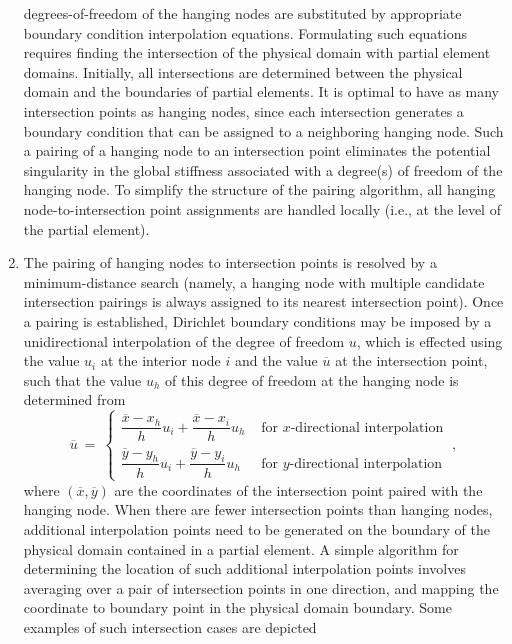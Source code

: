 \documentclass[12pt,twoside]{article}
\begin{document}
\begin{enumerate}
degrees-of-freedom of the hanging nodes are substituted by
appropriate boundary condition interpolation equations.
Formulating such equations requires finding the intersection of the physical 
domain with partial element domains. Initially, all intersections are
determined between the physical domain and the boundaries of partial
elements. It is optimal to have as many intersection points as 
hanging nodes, since each intersection generates a boundary condition
that can be assigned to a neighboring hanging node. 
Such a pairing of a hanging node to an intersection point eliminates the 
potential singularity in the global stiffness associated with a
degree(s) of freedom of the hanging node. To simplify the structure of
the pairing algorithm, all hanging node-to-intersection point
assignments are handled locally (i.e., at the level of the partial element). 
%
\item 
The pairing of hanging nodes
to intersection points is resolved by a minimum-distance search 
(namely, a hanging node with multiple candidate intersection pairings
is always assigned to its nearest intersection point). Once a
pairing is established, Dirichlet boundary conditions may be imposed
by a unidirectional interpolation of 
the degree of freedom $u$, which is effected using the value $u_i$ at the interior
node $i$ and the value $\overline{u}$ at the intersection point, such
that the value $u_h$ of this degree of freedom at the hanging node is
determined from  
%
\begin{equation}
\overline{u}\ =\ \left\{ 
\begin{array}{lr} 
\dfrac{\overline{x}-x_h}{h} u_i + \dfrac{\overline{x}-x_i}{h} u_h &
\text{ for } x\text{-directional interpolation} \\
\dfrac{\overline{y}-y_h}{h} u_i + \dfrac{\overline{y}-y_i}{h} u_h &
\text{ for } y\text{-directional interpolation}
\end{array}
\right.\ , 
\end{equation} 
%
where $(\overline{x},\overline{y})$ are the coordinates of the
intersection point paired with the hanging node.  
When there are fewer intersection points than hanging nodes, 
additional interpolation points need to be generated on the boundary 
of the physical domain contained in a partial element.  
A simple algorithm for determining the location of such additional 
interpolation points involves averaging over a pair of intersection points 
in one direction, and mapping the coordinate to boundary point in the 
physical domain boundary. Some examples of such intersection cases are depicted 

\end{enumerate}
\end{document}
